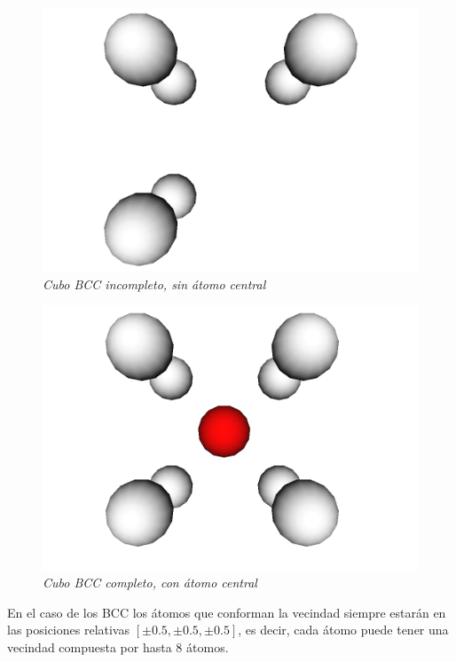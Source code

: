 \begin{figure}[H]
  \centering
  \includegraphics[scale=.3]{images/BCC-incomplete-molecule}
  \caption{\em Cubo BCC incompleto, sin átomo central}
\end{figure}

\begin{figure}[H]
  \centering
  \includegraphics[scale=.3]{images/BCC-complete-molecule}
  \caption{\em Cubo BCC completo, con átomo central}
\end{figure}

En el caso de los BCC los átomos que conforman la vecindad siempre estarán en las posiciones relativas $[\pm 0.5, \pm 0.5, \pm 0.5]$, es decir, cada átomo puede tener una vecindad compuesta por hasta 8 átomos.

